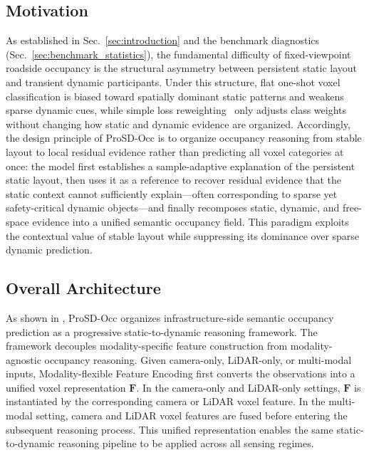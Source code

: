 \subsection{Motivation}
\label{sec:prosd_design_motivation}
As established in Sec.~\ref{sec:introduction} and the benchmark diagnostics
(Sec.~\ref{sec:benchmark_statistics}), the fundamental difficulty of
fixed-viewpoint roadside occupancy is the structural asymmetry between
persistent static layout and transient dynamic participants. Under this
structure, flat one-shot voxel classification is biased toward spatially
dominant static patterns and weakens sparse dynamic cues, while simple loss
reweighting~\cite{FocalLoss,ClassBalancedLoss} only adjusts class weights
without changing how static and dynamic evidence are organized. Accordingly, the
design principle of ProSD-Occ is to organize occupancy reasoning from stable
layout to local residual evidence rather than predicting all voxel categories at
once: the model first establishes a sample-adaptive explanation of the
persistent static layout, then uses it as a reference to recover residual
evidence that the static context cannot sufficiently explain---often
corresponding to sparse yet safety-critical dynamic objects---and finally
recomposes static, dynamic, and free-space evidence into a unified semantic
occupancy field. This paradigm exploits the contextual value of stable layout
while suppressing its dominance over sparse dynamic prediction.


\subsection{Overall Architecture}
\label{sec:prosd_overview}

As shown in , ProSD-Occ organizes
infrastructure-side semantic occupancy prediction as a progressive
static-to-dynamic reasoning framework. The framework decouples modality-specific
feature construction from modality-agnostic occupancy reasoning. Given
camera-only, LiDAR-only, or multi-modal inputs, Modality-flexible Feature
Encoding first converts the observations into a unified voxel representation
$\bm{F}$. In the camera-only and LiDAR-only settings, $\bm{F}$ is instantiated
by the corresponding camera or LiDAR voxel feature. In the multi-modal setting,
camera and LiDAR voxel features are fused before entering the subsequent
reasoning process. This unified representation enables the same
static-to-dynamic reasoning pipeline to be applied across all sensing regimes.

